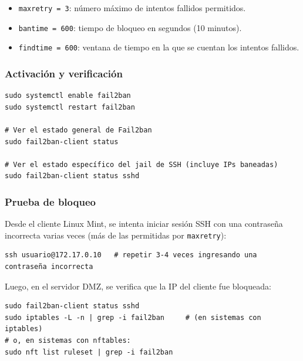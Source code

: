 \documentclass{article}
\providecommand{\tightlist}{%
  \setlength{\itemsep}{0pt}\setlength{\parskip}{0pt}}
\renewcommand{\_}{\oldunderscore\hskip0pt\relax}
\begin{document}
\begin{itemize}
\tightlist
\item
  \texttt{maxretry\ =\ 3}: número máximo de intentos fallidos
  permitidos.
\item
  \texttt{bantime\ =\ 600}: tiempo de bloqueo en segundos (10 minutos).
\item
  \texttt{findtime\ =\ 600}: ventana de tiempo en la que se cuentan los
  intentos fallidos.
\end{itemize}

\hypertarget{activaciuxf3n-y-verificaciuxf3n}{%
\subsubsection{Activación y
verificación}\label{activaciuxf3n-y-verificaciuxf3n}}

\begin{Verbatim}[fontsize=\footnotesize,frame=single,rulecolor=\color{codebg},fillcolor=\color{codebg},framesep=2mm,xleftmargin=1mm,xrightmargin=1mm,breaklines=true,breakanywhere=true,breaksymbolleft={},breaksymbolright={}]
sudo systemctl enable fail2ban
sudo systemctl restart fail2ban

# Ver el estado general de Fail2ban
sudo fail2ban-client status

# Ver el estado específico del jail de SSH (incluye IPs baneadas)
sudo fail2ban-client status sshd
\end{Verbatim}

\hypertarget{prueba-de-bloqueo}{%
\subsubsection{Prueba de bloqueo}\label{prueba-de-bloqueo}}

Desde el cliente Linux Mint, se intenta iniciar sesión SSH con una
contraseña incorrecta varias veces (más de las permitidas por
\texttt{maxretry}):

\begin{Verbatim}[fontsize=\footnotesize,frame=single,rulecolor=\color{codebg},fillcolor=\color{codebg},framesep=2mm,xleftmargin=1mm,xrightmargin=1mm,breaklines=true,breakanywhere=true,breaksymbolleft={},breaksymbolright={}]
ssh usuario@172.17.0.10   # repetir 3-4 veces ingresando una contraseña incorrecta
\end{Verbatim}

Luego, en el servidor DMZ, se verifica que la IP del cliente fue
bloqueada:

\begin{Verbatim}[fontsize=\footnotesize,frame=single,rulecolor=\color{codebg},fillcolor=\color{codebg},framesep=2mm,xleftmargin=1mm,xrightmargin=1mm,breaklines=true,breakanywhere=true,breaksymbolleft={},breaksymbolright={}]
sudo fail2ban-client status sshd
sudo iptables -L -n | grep -i fail2ban     # (en sistemas con iptables)
# o, en sistemas con nftables:
sudo nft list ruleset | grep -i fail2ban
\end{Verbatim}
\end{document}
